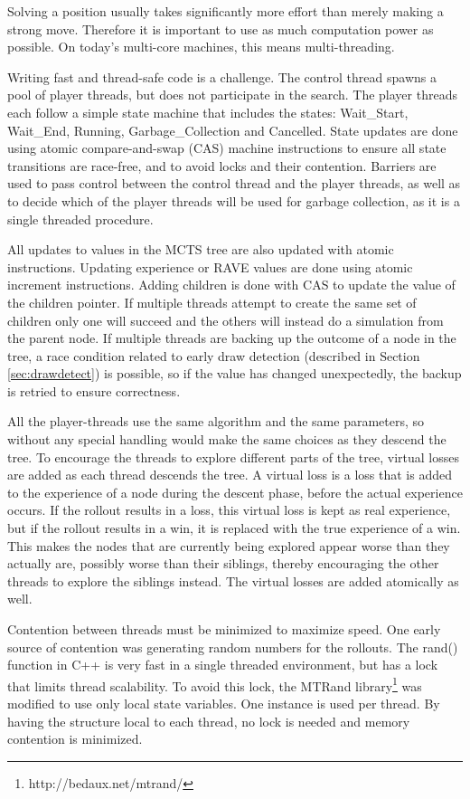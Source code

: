 Solving a position usually takes significantly more effort than merely making a strong move. Therefore it is important to use as much computation power as possible. On today's multi-core machines, this means multi-threading.

Writing fast and thread-safe code is a challenge. The control thread spawns a pool of player threads, but does not participate in the search. The player threads each follow a simple state machine that includes the states: Wait\_Start, Wait\_End, Running, Garbage\_Collection and Cancelled. State updates are done using atomic compare-and-swap (CAS) machine instructions to ensure all state transitions are race-free, and to avoid locks and their contention. Barriers are used to pass control between the control thread and the player threads, as well as to decide which of the player threads will be used for garbage collection, as it is a single threaded procedure.

All updates to values in the MCTS tree are also updated with atomic instructions. Updating experience or RAVE values are done using atomic increment instructions. Adding children is done with CAS to update the value of the children pointer. If multiple threads attempt to create the same set of children only one will succeed and the others will instead do a simulation from the parent node. If multiple threads are backing up the outcome of a node in the tree, a race condition related to early draw detection (described in Section \ref{sec:drawdetect}) is possible, so if the value has changed unexpectedly, the backup is retried to ensure correctness.

All the player-threads use the same algorithm and the same parameters, so without any special handling would make the same choices as they descend the tree. To encourage the threads to explore different parts of the tree, virtual losses\cite{chaslot2008parallel} are added as each thread descends the tree. A virtual loss is a loss that is added to the experience of a node during the descent phase, before the actual experience occurs. If the rollout results in a loss, this virtual loss is kept as real experience, but if the rollout results in a win, it is replaced with the true experience of a win. This makes the nodes that are currently being explored appear worse than they actually are, possibly worse than their siblings, thereby encouraging the other threads to explore the siblings instead. The virtual losses are added atomically as well.

Contention between threads must be minimized to maximize speed. One early source of contention was generating random numbers for the rollouts. The rand() function in C++ is very fast in a single threaded environment, but has a lock that limits thread scalability. To avoid this lock, the MTRand library\footnote{http://bedaux.net/mtrand/} was modified to use only local state variables. One instance is used per thread. By having the structure local to each thread, no lock is needed and memory contention is minimized.

